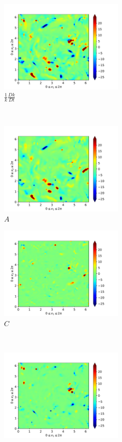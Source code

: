 \begin{figure}[H]
    \begin{subfigure}[H]{0.45\textwidth}
        \includegraphics[height=1.75in]{media/run-cds-65/ke-1380}
        \caption{$\frac{1}{k} \frac{D k}{Dt}$}
    \end{subfigure}
    ~
    \begin{subfigure}{0.45\textwidth}
        \includegraphics[height=1.75in]{media/run-cds-65/A-ke-1380}
        \caption{$A$}
    \end{subfigure}
    \newline
    \begin{subfigure}{0.45\textwidth}
        \includegraphics[height=1.75in]{media/run-cds-65/C-ke-1380}
        \caption{$C$}
    \end{subfigure}
    ~
    \begin{subfigure}{0.45\textwidth}
        \includegraphics[height=1.75in]{media/run-cds-65/P-ke-1380}

\end{subfigure}
\end{figure}
